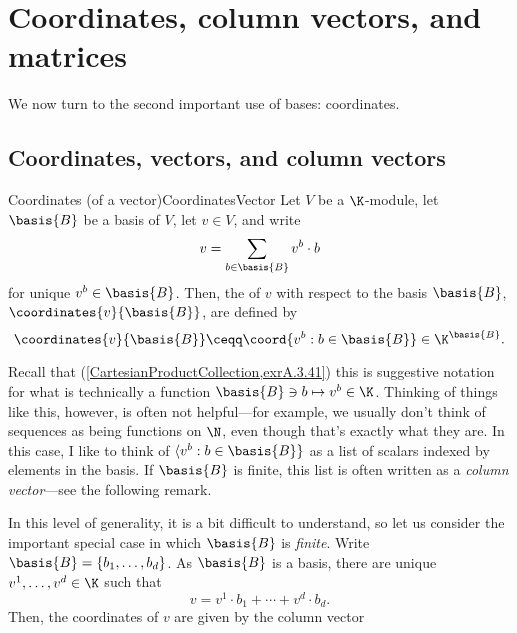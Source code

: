 \chapter{Coordinates, column vectors, and matrices}

We now turn to the second important use of bases:  coordinates.

\section{Coordinates, vectors, and column vectors}

\begin{dfn}{Coordinates (of a vector)}{CoordinatesVector}
	Let $V$ be a $\K$-module, let $\basis{B}$ be a basis of $V$, let $v\in V$, and write
	\begin{equation}
		v=\sum _{b\in \basis{B}}v^b\cdot b
	\end{equation}
	for unique $v^b\in \basis{B}$.  Then, the  of $v$ with respect to the basis $\basis{B}$, $\coordinates{v}{\basis{B}}$, are defined by
	\begin{equation}
		\coordinates{v}{\basis{B}}\ceqq \coord{v^b:b\in \basis{B}}\in \K ^{\basis{B}}.
	\end{equation}
	\begin{rmk}
		Recall that (\cref{CartesianProductCollection,exrA.3.41}) this is suggestive notation for what is technically a function $\basis{B}\ni b\mapsto v^b\in \K$.  Thinking of things like this, however, is often not helpful---for example, we usually don't think of sequences as being functions on $\N$, even though that's exactly what they are.  In this case, I like to think of $\langle v^b:b\in \basis{B}\}$ as a list of scalars indexed by elements in the basis.  If $\basis{B}$ is finite, this list is often written as a \emph{column vector}---see the following remark.
	\end{rmk}
	\begin{rmk}
		In this level of generality, it is a bit difficult to understand, so let us consider the important special case in which $\basis{B}$ is \emph{finite}.  Write $\basis{B}=\{ b_1,\ldots ,b_d\}$.  As $\basis{B}$ is a basis, there are unique $v^1,\ldots ,v^d\in \K$ such that
		\begin{equation}
			v=v^1\cdot b_1+\cdots +v^d\cdot b_d.
		\end{equation}
		Then, the coordinates of $v$ are given by the column vector
		\begin{equation}

\end{equation}
\end{rmk}
\end{dfn}
